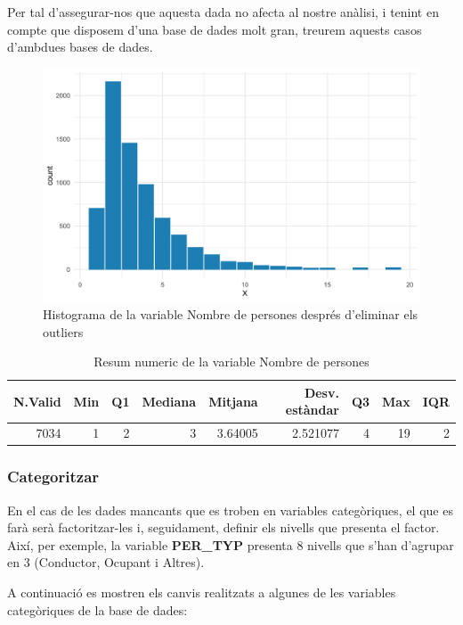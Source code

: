 \documentclass[12pt,longbibliography]{article}
\theoremstyle{definition}
\theoremstyle{remark}
\begin{document}
Per tal d'assegurar-nos que aquesta dada no afecta al nostre anàlisi, i tenint en compte que disposem d'una base de dades molt gran, treurem aquests casos d'ambdues bases de dades. 


\begin{figure}[H]
\begin{center}
\includegraphics[width=12.5cm]{Figura2}
\end{center}
\caption{Histograma de la variable Nombre de persones després d'eliminar els outliers}
\label{fig:F2}
\end{figure}

\begin{table}[H]
\centering
\begin{tabular}{|r|r|r|r|r|r|r|r|r|}
\hline
N.Valid & Min & Q1 & Mediana & Mitjana  & Desv. estàndar & Q3 & Max & IQR \\ \hline
7034    & 1   & 2  & 3       & 3.64005 & 2.521077       & 4  & 19  & 2   \\ \hline
\end{tabular}
\caption{Resum numeric de la variable Nombre de persones}
\label{tab:Fig2-table}
\end{table}

\subsubsection{Categoritzar}

En el cas de les dades mancants que es troben en variables categòriques, el que es farà serà factoritzar-les i, seguidament, definir els nivells que presenta el factor. Així, per exemple, la variable \textbf{PER\_TYP} presenta 8 nivells que s'han d'agrupar en 3 (Conductor, Ocupant i Altres). 


A continuació es mostren els canvis realitzats a algunes de les variables categòriques de la base de dades:
\end{document}
